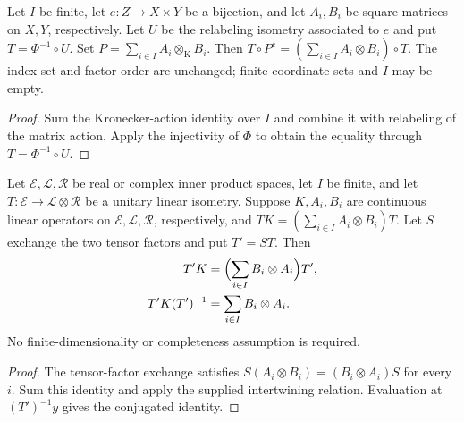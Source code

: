 \begin{theorem}
    \label{thm:euclidean_reindexed_tensor_sum}
    \leanok
    Let $I$ be finite, let $e:Z\longrightarrow X\times Y$ be a bijection,
    and let $A_i,B_i$ be square matrices on $X,Y$, respectively.
    Let $U$ be the relabeling isometry associated to $e$ and put
    $T=\Phi^{-1}\circ U$. Set $P=\sum_{i\in I}A_i\otimes_{\mathrm K}B_i$.
    Then $T\circ P^e=(\sum_{i\in I}A_i\otimes B_i)\circ T$.
    The index set and factor order are unchanged; finite coordinate
    sets and $I$ may be empty.
\end{theorem}

\begin{proof}\leanok
    Sum the Kronecker-action identity over $I$ and combine it with
    relabeling of the matrix action. Apply the injectivity of $\Phi$
    to obtain the equality through $T=\Phi^{-1}\circ U$.
\end{proof}

\begin{theorem}
    \label{thm:tensor_intertwining_exchange}
    \leanok
    Let $\mathcal E,\mathcal L,\mathcal R$ be real or complex inner product
    spaces, let $I$ be finite, and let
    $T:\mathcal E\longrightarrow\mathcal L\otimes\mathcal R$ be a unitary
    linear isometry. Suppose $K,A_i,B_i$ are continuous linear operators
    on $\mathcal E,\mathcal L,\mathcal R$, respectively, and
    $TK=(\sum_{i\in I}A_i\otimes B_i)T$.
    Let $S$ exchange the two tensor factors and put $T'=ST$. Then
    \begin{align}
        T'K          & =\Bigl(\sum_{i\in I}B_i\otimes A_i\Bigr)T', \\
        T'K(T')^{-1} & =\sum_{i\in I}B_i\otimes A_i.
    \end{align}
    No finite-dimensionality or completeness assumption is required.
\end{theorem}

\begin{proof}\leanok
    The tensor-factor exchange satisfies
    $S(A_i\otimes B_i)=(B_i\otimes A_i)S$ for every $i$.
    Sum this identity and apply the supplied intertwining relation.
    Evaluation at $(T')^{-1}y$ gives the conjugated identity.
\end{proof}


